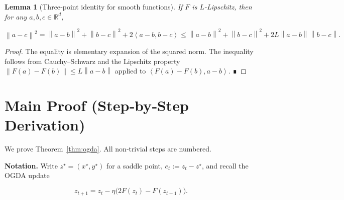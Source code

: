 \documentclass{article}
\newtheorem{lemma}{Lemma}
\newcommand{\norm}[1]{\left\|#1\right\|}
\newcommand{\iprod}[2]{\left\langle #1,#2\right\rangle}
\begin{document}
\begin{lemma}[Three‑point identity for smooth functions]\label{lem:three}
If \(F\) is \(L\)-Lipschitz, then for any \(a,b,c\in\mathbb{R}^{d}\),

\[
\norm{a-c}^{2}= \norm{a-b}^{2}+\norm{b-c}^{2}+2\iprod{a-b}{b-c}
\le \norm{a-b}^{2}+\norm{b-c}^{2}+2L\norm{a-b}\norm{b-c}.
\tag{2}
\]
\end{lemma}
\begin{proof}
The equality is elementary expansion of the squared norm.  
The inequality follows from Cauchy–Schwarz and the Lipschitz property
\(\norm{F(a)-F(b)}\le L\norm{a-b}\) applied to \(\iprod{F(a)-F(b)}{a-b}\).  ∎
\end{proof}

\section*{Main Proof (Step‑by‑Step Derivation)}
We prove Theorem~\ref{thm:ogda}.  All non‑trivial steps are numbered.

\medskip
\noindent\textbf{Notation.}  Write \(z^\star=(x^\star,y^\star)\) for a saddle point,
\(e_t:=z_t-z^\star\), and recall the OGDA update  

\[
z_{t+1}=z_t-\eta\big(2F(z_t)-F(z_{t-1})\big).\tag{3}
\]
\end{document}
